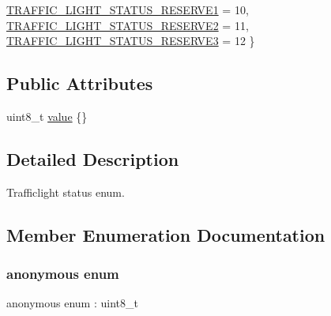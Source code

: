 \begin{DoxyCompactItemize}
\hyperlink{structmaf__perception__interface_1_1TrafficLightStatusEnum_a0f6e108b726313b712796cdac72b942aa6a3c9ae7e135b40a14d8fa02ca6cdfc0}{T\+R\+A\+F\+F\+I\+C\+\_\+\+L\+I\+G\+H\+T\+\_\+\+S\+T\+A\+T\+U\+S\+\_\+\+R\+E\+S\+E\+R\+V\+E1} = 10, 
\hyperlink{structmaf__perception__interface_1_1TrafficLightStatusEnum_a0f6e108b726313b712796cdac72b942aadf628fe34995e1b00e8c62ed9b5bc485}{T\+R\+A\+F\+F\+I\+C\+\_\+\+L\+I\+G\+H\+T\+\_\+\+S\+T\+A\+T\+U\+S\+\_\+\+R\+E\+S\+E\+R\+V\+E2} = 11, 
\newline
\hyperlink{structmaf__perception__interface_1_1TrafficLightStatusEnum_a0f6e108b726313b712796cdac72b942aa57bad0c08b4ea26c4a8bcf3b99919cb6}{T\+R\+A\+F\+F\+I\+C\+\_\+\+L\+I\+G\+H\+T\+\_\+\+S\+T\+A\+T\+U\+S\+\_\+\+R\+E\+S\+E\+R\+V\+E3} = 12
 \}
\end{DoxyCompactItemize}
\subsection*{Public Attributes}
\begin{DoxyCompactItemize}
\item 
uint8\+\_\+t \hyperlink{structmaf__perception__interface_1_1TrafficLightStatusEnum_a6499b7450f13b80b43c9ea879a56f47d}{value} \{\}
\end{DoxyCompactItemize}


\subsection{Detailed Description}
Trafficlight status enum. 

\subsection{Member Enumeration Documentation}
\mbox{\label{structmaf__perception__interface_1_1TrafficLightStatusEnum_a0f6e108b726313b712796cdac72b942a}} 
\subsubsection{\texorpdfstring{anonymous enum}{anonymous enum}}
{\footnotesize\ttfamily anonymous enum \+: uint8\+\_\+t}

